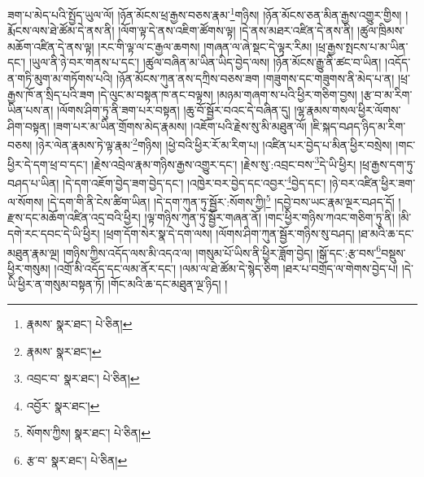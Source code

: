 ཟག་པ་མེད་པའི་སྤྱོད་ཡུལ་ལོ། །ཉོན་མོངས་ཕྲ་རྒྱས་བཅས་རྣམ་\footnote{རྣམས་  སྣར་ཐང་།  པེ་ཅིན། }གཉིས། །ཉོན་མོངས་ཅན་མིན་རྒྱས་འགྱུར་གྱིས། །རྨོངས་ལས་ཐེ་ཚོམ་དེ་ནས་ནི། །ལོག་ལྟ་དེ་ནས་འཇིག་ཚོགས་ལྟ། །དེ་ནས་མཐར་འཛིན་དེ་ནས་ནི། །ཚུལ་ཁྲིམས་མཆོག་འཛིན་དེ་ནས་ལྟ། །རང་གི་ལྟ་ལ་ང་རྒྱལ་ཆགས། །གཞན་ལ་ཞེ་སྡང་དེ་ལྟར་རིམ། །ཕྲ་རྒྱས་སྤངས་པ་མ་ཡིན་དང་། །ཡུལ་ནི་ཉེ་བར་གནས་པ་དང་། །ཚུལ་བཞིན་མ་ཡིན་ཡིད་བྱེད་ལས། །ཉོན་མོངས་རྒྱུ་ནི་ཚང་བ་ཡིན། །འདོད་ན་གཏི་མུག་མ་གཏོགས་པའི། །ཉོན་མོངས་ཀུན་ནས་དཀྲིས་བཅས་ཟག །གཟུགས་དང་གཟུགས་ནི་མེད་པ་ན། །ཕྲ་རྒྱས་ཁོ་ན་སྲིད་པའི་ཟག །དེ་ལུང་མ་བསྟན་ཁ་ནང་བལྟས། །མཉམ་གཞག་ས་པའི་ཕྱིར་གཅིག་བྱས། །རྩ་བ་མ་རིག་ཡིན་པས་ན། །ལོགས་ཤིག་ཏུ་ནི་ཟག་པར་བསྟན། །ཆུ་བོ་སྦྱོར་བའང་དེ་བཞིན་དུ། །ལྷ་རྣམས་གསལ་ཕྱིར་ལོགས་ཤིག་བསྟན། །ཟག་པར་མ་ཡིན་གྲོགས་མེད་རྣམས། །འཇོག་པའི་རྗེས་སུ་མི་མཐུན་ལོ། །ཇི་སྐད་བཤད་ཉིད་མ་རིག་བཅས། །ཉེར་ལེན་རྣམས་ཏེ་ལྟ་རྣམ་\footnote{རྣམས་  སྣར་ཐང་། }གཉིས། །ཕྱེ་བའི་ཕྱིར་རོ་མ་རིག་པ། །འཛིན་པར་བྱེད་པ་མིན་ཕྱིར་བསྲེས། །གང་ཕྱིར་དེ་དག་ཕྲ་བ་དང་། །རྗེས་འབྲེལ་རྣམ་གཉིས་རྒྱས་འགྱུར་དང་། །རྗེས་སུ་:འབྲང་བས་\footnote{འབྲང་བ་  སྣར་ཐང་།  པེ་ཅིན། }དེ་ཡི་ཕྱིར། །ཕྲ་རྒྱས་དག་ཏུ་བཤད་པ་ཡིན། །དེ་དག་འཇོག་བྱེད་ཟག་བྱེད་དང་། །འཁྱེར་བར་བྱེད་དང་འབྱར་\footnote{འབྱོར་  སྣར་ཐང་། }བྱེད་དང་། །ཉེ་བར་འཛིན་ཕྱིར་ཟག་ལ་སོགས། །དེ་དག་གི་ནི་ངེས་ཚིག་ཡིན། །དེ་དག་ཀུན་ཏུ་སྦྱོར་:སོགས་ཀྱི།\footnote{སོགས་ཀྱིས།  སྣར་ཐང་།  པེ་ཅིན། } །དབྱེ་བས་ཡང་རྣམ་ལྔར་བཤད་དོ། །རྫས་དང་མཆོག་འཛིན་འདྲ་བའི་ཕྱིར། །ལྟ་གཉིས་ཀུན་ཏུ་སྦྱོར་གཞན་ནོ། །གང་ཕྱིར་གཉིས་ཀའང་གཅིག་ཏུ་ནི། །མི་དགེ་རང་དབང་དེ་ཡི་ཕྱིར། །ཕྲག་དོག་སེར་སྣ་དེ་དག་ལས། །ལོགས་ཤིག་ཀུན་སྦྱོར་གཉིས་སུ་བཤད། །ཐ་མའི་ཆ་དང་མཐུན་རྣམ་ལྔ། །གཉིས་ཀྱིས་འདོད་ལས་མི་འདའ་ལ། །གསུམ་པོ་ཡིས་ནི་ཕྱིར་ཟློག་བྱེད། །སྒོ་དང་:རྩ་བས་\footnote{རྩ་བ་  སྣར་ཐང་།  པེ་ཅིན། }བསྡུས་ཕྱིར་གསུམ། །འགྲོ་མི་འདོད་དང་ལམ་ནོར་དང་། །ལམ་ལ་ཐེ་ཚོམ་དེ་སྙེད་ཅིག །ཐར་པ་བགྲོད་ལ་གེགས་བྱེད་པ། །དེ་ཡི་ཕྱིར་ན་གསུམ་བསྟན་ཏོ། །གོང་མའི་ཆ་དང་མཐུན་ལྔ་ཉིད། །
